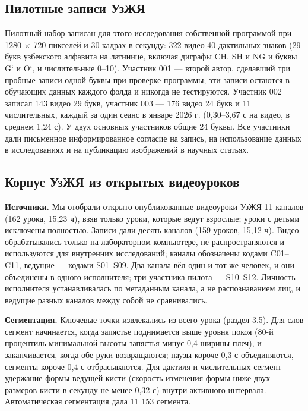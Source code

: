 \documentclass[a4paper,fleqn]{cas-dc}
\begin{document}
\hypertarget{ux43fux438ux43bux43eux442ux43dux44bux435-ux437ux430ux43fux438ux441ux438-ux443ux437ux436ux44f}{%
\subsection{Пилотные записи УзЖЯ}\label{ux43fux438ux43bux43eux442ux43dux44bux435-ux437ux430ux43fux438ux441ux438-ux443ux437ux436ux44f}}

Пилотный набор записан для этого исследования собственной программой при 1280 $\times$ 720 пикселей и 30 кадрах в секунду: 322 видео 40 дактильных знаков (29 букв узбекского алфавита на латинице, включая диграфы CH, SH и NG и буквы G‘ и O‘, и числительные 0--10). Участник 001 --- второй автор, сделавший три пробные записи одной буквы при проверке программы; эти записи остаются в обучающих данных каждого фолда и никогда не тестируются. Участник 002 записал 143 видео 29 букв, участник 003 --- 176 видео 24 букв и 11 числительных, каждый за один сеанс в январе 2026 г. (0,30--3,67 с на видео, в среднем 1,24 с). У двух основных участников общие 24 буквы. Все участники дали письменное информированное согласие на запись, на использование данных в исследованиях и на публикацию изображений в научных статьях.

\hypertarget{ux43aux43eux440ux43fux443ux441-ux443ux437ux436ux44f-ux438ux437-ux43eux442ux43aux440ux44bux442ux44bux445-ux432ux438ux434ux435ux43eux443ux440ux43eux43aux43eux432}{%
\subsection{Корпус УзЖЯ из открытых видеоуроков}\label{ux43aux43eux440ux43fux443ux441-ux443ux437ux436ux44f-ux438ux437-ux43eux442ux43aux440ux44bux442ux44bux445-ux432ux438ux434ux435ux43eux443ux440ux43eux43aux43eux432}}

\textbf{Источники.} Мы отобрали открыто опубликованные видеоуроки УзЖЯ 11 каналов (162 урока, 15,23 ч), взяв только уроки, которые ведут взрослые; уроки с детьми исключены полностью. Записи дали десять каналов (159 уроков, 15,12 ч). Видео обрабатывались только на лабораторном компьютере, не распространяются и используются для внутренних исследований; каналы обозначены кодами C01--C11, ведущие --- кодами S01--S09. Два канала вёл один и тот же человек, и они объединены в одного исполнителя; три участника пилота --- S10--S12. Личность исполнителя устанавливалась по метаданным канала, а не распознаванием лиц, и ведущие разных каналов между собой не сравнивались.

\textbf{Сегментация.} Ключевые точки извлекались из всего урока (раздел 3.5). Для слов сегмент начинается, когда запястье поднимается выше уровня покоя (80-й процентиль минимальной высоты запястья минус 0,4 ширины плеч), и заканчивается, когда обе руки возвращаются; паузы короче 0,3 с объединяются, сегменты короче 0,4 с отбрасываются. Для дактиля и числительных сегмент --- удержание формы ведущей кисти (скорость изменения формы ниже двух размеров кисти в секунду не менее 0,32 с) внутри активного интервала. Автоматическая сегментация дала 11 153 сегмента.
\end{document}
